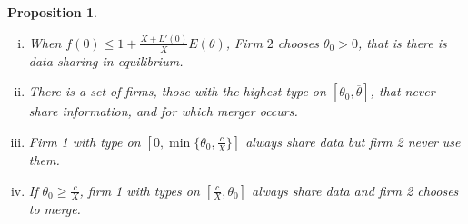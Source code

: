 \documentclass[a4paper]{article}
\newtheorem{prop}{Proposition}
\renewcommand{\t}{\theta}
\begin{document}
\begin{prop}~~

  \begin{enumerate}[(i)]\setlength\itemsep{0em}
    \item When $f(0)\leq 1+\frac{X+L'(0)}{X}E(\t)$, Firm $2$ chooses $\t_0>0$, that is there is data sharing in equilibrium. 
    \item There is a set of firms, those with the highest type on $[\t_0,\overline \t]$, that never share information, and for which merger occurs.
    \item Firm 1 with type on $[0,\min\{\t_0,\frac{c}{X}\}]$ always share data but firm 2 never use them.
    \item If $\t_0\geq \frac{c}{X}$, firm 1 with types on $[\frac{c}{X},\t_0]$ always share data and firm 2 chooses to merge.
  \end{enumerate}
\end{prop}
\end{document}
